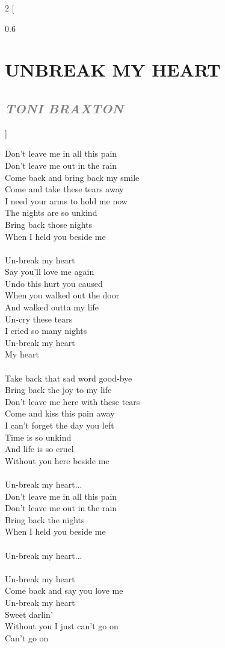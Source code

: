 \documentclass[100pt,a4paper]{report}
\newenvironment{song2}[2]
	{	
    	\begin{multicols*}{2}
		[
			\begin{spacing}{0.6}
				\section*{\LARGE\centering \MakeUppercase{\textbf{{#1}}}}
				\subsection*{\Large\centering \textit{\textcolor{gray}{\MakeUppercase{{#2}}}}}
			\end{spacing}
		]
		\Large
	}
	{
	\end{multicols*}
	\newpage
    }
\begin{document}
\begin{song2}{Unbreak my heart}{Toni Braxton}
\noindent
Don't leave me in all this pain\\
Don't leave me out in the rain\\
Come back and bring back my smile\\
Come and take these tears away\\
I need your arms to hold me now\\
The nights are so unkind\\
Bring back those nights\\ 
When I held you beside me\\
\\
Un-break my heart\\
Say you'll love me again\\
Undo this hurt you caused\\
When you walked out the door\\
And walked outta my life\\
Un-cry these tears\\
I cried so many nights\\
Un-break my heart\\
My heart\\
\\
Take back that sad word good-bye\\
Bring back the joy to my life\\
Don't leave me here with these tears\\
Come and kiss this pain away\\
I can't forget the day you left\\
Time is so unkind\\
And life is so cruel\\ 
Without you here beside me\\
\\
Un-break my heart...\\
\vfill
\columnbreak
\noindent
Don't leave me in all this pain\\
Don't leave me out in the rain\\
Bring back the nights\\ 
When I held you beside me\\
\\
Un-break my heart...\\
\\
Un-break my heart\\
Come back and say you love me\\
Un-break my heart\\
Sweet darlin'\\
Without you I just can't go on\\
Can't go on\\
\end{song2}
\end{document}
